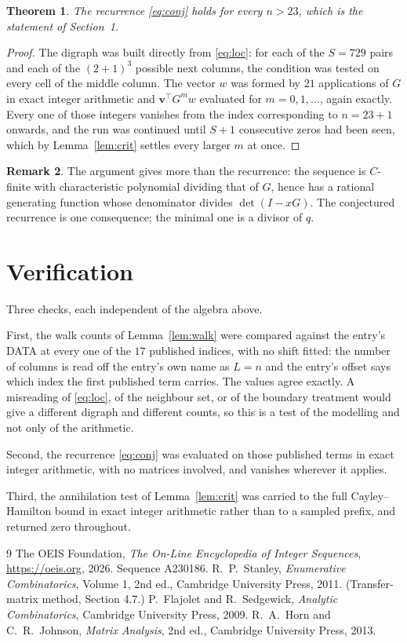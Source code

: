 \documentclass[11pt,a4paper]{article}
\theoremstyle{plain}
\newtheorem{theorem}{Theorem}
\theoremstyle{definition}
\newtheorem{remark}[theorem]{Remark}
\begin{document}
\begin{theorem}
The recurrence \eqref{eq:conj} holds for every $n>23$, which is the statement of
Section~1.
\end{theorem}

\begin{proof}
The digraph was built directly from \eqref{eq:loc}: for each of the $S=729$ pairs and each
of the $(2+1)^{3}$ possible next columns, the condition was tested on every cell of
the middle column. The vector $w$ was formed by $21$ applications of $G$ in exact integer
arithmetic and $\mathbf{v}^{\!\top}G^{m}w$ evaluated for $m=0,1,\dots$, again exactly.
Every one of those integers vanishes from the index corresponding to $n=23+1$ onwards,
and the run was continued until $S+1$ consecutive zeros had been seen, which by
Lemma~\ref{lem:crit} settles every larger $m$ at once.
\end{proof}

\begin{remark}
The argument gives more than the recurrence: the sequence is $C$-finite with characteristic
polynomial dividing that of $G$, hence has a rational generating function whose denominator
divides $\det(I-xG)$. The conjectured recurrence is one consequence; the minimal one is a
divisor of $q$.
\end{remark}

\section{Verification}

Three checks, each independent of the algebra above.

First, the walk counts of Lemma~\ref{lem:walk} were compared against the entry's DATA at
every one of the $17$ published indices, with no shift fitted: the number of columns is
read off the entry's own name as $L=n$ and the entry's offset says which index the first
published term carries. The values agree exactly. A misreading of \eqref{eq:loc}, of the
neighbour set, or of the boundary treatment would give a different digraph and different
counts, so this is a test of the modelling and not only of the arithmetic.

Second, the recurrence \eqref{eq:conj} was evaluated on those published terms in exact
integer arithmetic, with no matrices involved, and vanishes wherever it applies.

Third, the annihilation test of Lemma~\ref{lem:crit} was carried to the full
Cayley--Hamilton bound in exact integer arithmetic rather than to a sampled prefix, and
returned zero throughout.

\begin{thebibliography}{9}
 The OEIS Foundation, \emph{The On-Line Encyclopedia of Integer
Sequences}, \url{https://oeis.org}, 2026. Sequence A230186.
 R.~P.~Stanley, \emph{Enumerative Combinatorics}, Volume 1, 2nd ed.,
Cambridge University Press, 2011. (Transfer-matrix method, Section 4.7.)
 P.~Flajolet and R.~Sedgewick, \emph{Analytic Combinatorics}, Cambridge
University Press, 2009.
 R.~A.~Horn and C.~R.~Johnson, \emph{Matrix Analysis}, 2nd ed., Cambridge
University Press, 2013.
\end{thebibliography}
\end{document}
